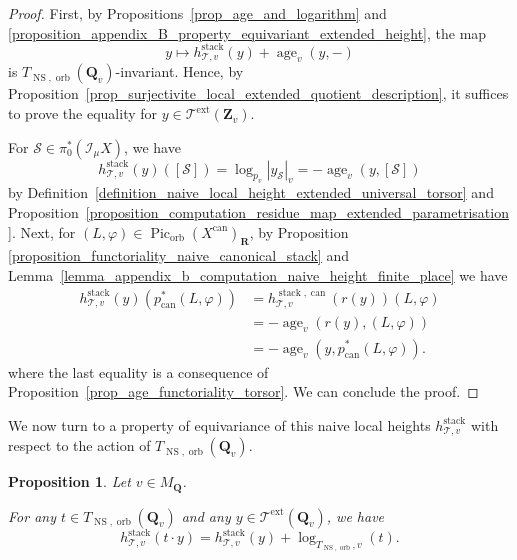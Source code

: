 \documentclass{proc-l}
\newcommand{\R}{\mathbf{R}}
\newcommand{\Z}{\mathbf{Z}}
\newcommand{\Q}{\mathbf{Q}}
\DeclareMathOperator{\Pic}{Pic}
\DeclareMathOperator{\can}{can}
\DeclareMathOperator{\stack}{stack}
\DeclareMathOperator{\age}{age}
\DeclareMathOperator{\NS}{NS}
\DeclareMathOperator{\orb}{orb}
\DeclareMathOperator{\ext}{ext}
\newcommand{\stackS}{\mathcal{S}}
\newcommand{\stackT}{\mathcal{T}}
\newcommand{\sheafI}{\mathcal{I}}
\newcommand{\twistsector}{\pi_0^*(\sheafI_{\mu} X)}
\newtheorem{prop}[theorem]{Proposition}
\theoremstyle{definition}
\theoremstyle{remark}
\numberwithin{equation}{section}
\begin{document}
\begin{proof}
First, by Propositions~\ref{prop_age_and_logarithm} and \ref{proposition_appendix_B_property_equivariant_extended_height}, the map
\[
    y \mapsto h_{\stackT,v}^{\stack}(y) + \age_v\left(y,-\right)
\]
is $T_{\NS,\orb}(\Q_v)$-invariant. Hence, by Proposition~\ref{prop_surjectivite_local_extended_quotient_description}, it suffices to prove the equality for $y \in \stackT^{\ext}(\Z_v)$.

For $\stackS \in \twistsector$, we have
\[
    h_{\stackT,v}^{\stack}(y)\left([\stackS]\right) = \log_{p_v} \left|y_{\stackS}\right|_v = - \age_v\left(y,[\stackS]\right)
\]
by Definition~\ref{definition_naive_local_height_extended_universal_torsor} and Proposition~\ref{proposition_computation_residue_map_extended_parametrisation}. Next, for $\left(L,\varphi\right) \in \Pic_{\orb}(X^{\can})_{\R}$, by  Proposition \ref{proposition_functoriality_naive_canonical_stack} and Lemma~\ref{lemma_appendix_b_computation_naive_height_finite_place} we have
\begin{align*}
h_{\stackT,v}^{\stack}(y)\left(p_{\can}^*\left(L,\varphi\right)\right)
&= h_{\stackT,v}^{\stack,\can}\left(r(y)\right)\left(L,\varphi\right) \\
&= - \age_{v}\left(r(y),\left(L,\varphi\right)\right) \\
&= - \age_{v}\left(y,p_{\can}^*\left(L,\varphi\right)\right).
\end{align*}
where the last equality is a consequence of Proposition~\ref{prop_age_functoriality_torsor}. We can conclude the proof.

\end{proof}


We now turn to a property of equivariance of this naive local heights $h_{\stackT,v}^{\stack}$ with respect to the action of $T_{\NS,\orb}(\Q_v)$.

\begin{prop}\label{proposition_property_equivariant_naive_height}
Let $v \in M_{\Q}$.

For any $t \in T_{\NS,\orb}(\Q_v)$ and any $y \in \stackT^{\ext}(\Q_v)$, we have
\[
h_{\stackT,v}^{\stack}(t \cdot y)
=
h_{\stackT,v}^{\stack}(y)
+
\log_{T_{\NS,\orb},v}(t).
\]
\end{prop}
\end{document}
